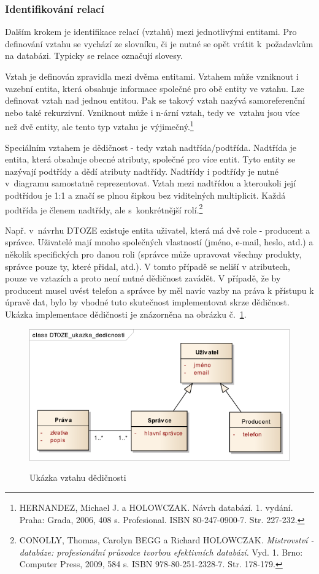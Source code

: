 \documentclass[11pt,a4paper]{article}
\begin{document}
\subsubsection{Identifikování relací}
Dalším krokem je identifikace relací (vztahů) mezi jednotlivými entitami. Pro definování vztahu se vychází ze slovníku, či je nutné se opět vrátit k~požadavkům na databázi. Typicky se relace označují slovesy.  

Vztah je definován zpravidla mezi dvěma entitami. Vztahem může vzniknout i vazební entita, která obsahuje informace společné pro obě entity ve vztahu. Lze definovat vztah nad jednou entitou. Pak se takový vztah nazývá samoreferenční nebo také rekurzivní. Vzniknout může i n-ární vztah, tedy ve~vztahu jsou více než dvě entity, ale tento typ vztahu je výjimečný.\footnote{HERNANDEZ, Michael J. a HOLOWCZAK. Návrh databází. 1. vydání. Praha: Grada, 2006, 408 s. Profesional. ISBN 80-247-0900-7. Str. 227-232.}

Speciálním vztahem je dědičnost - tedy vztah nadtřída/podtřída. Nadtřída je entita, která obsahuje obecné atributy, společné pro více entit. Tyto entity se nazývají podtřídy a dědí atributy nadtřídy. Nadtřídy i podtřídy je nutné v~diagramu samostatně reprezentovat. Vztah mezi nadtřídou a kteroukoli její podtřídou je 1:1 a značí se plnou šipkou bez viditelných multiplicit. Každá podtřída je členem nadtřídy, ale s~konkrétnější rolí.\footnote{CONOLLY, Thomas, Carolyn BEGG a Richard HOLOWCZAK. \textit{Mistrovství - databáze: profesionální průvodce tvorbou efektivních databází.} Vyd. 1. Brno: Computer Press, 2009, 584 s. ISBN 978-80-251-2328-7. Str. 178-179.} 

Např. v~návrhu DTOZE existuje entita uživatel, která má dvě role - producent a správce. Uživatelé mají mnoho společných vlastností (jméno, e-mail, heslo, atd.) a několik specifických pro danou roli (správce může upravovat všechny produkty, správce pouze ty, které přidal, atd.). V tomto případě se neliší v atributech, pouze ve vztazích a proto není nutné dědičnost zavádět. V případě, že by producent musel uvést telefon a správce by měl navíc vazby na práva k přístupu k úpravě dat, bylo by vhodné tuto skutečnost implementovat skrze dědičnost. Ukázka implementace dědičnosti je znázorněna na obrázku č.~\ref{fig:dedicnost}.

\begin{figure}[H] 
\centering 
\caption{Ukázka vztahu dědičnosti} 
\vspace{0.2cm}
\includegraphics[scale=0.6]{dedicnost_n} 
\label{fig:dedicnost}
\end{figure} 
\end{document}
